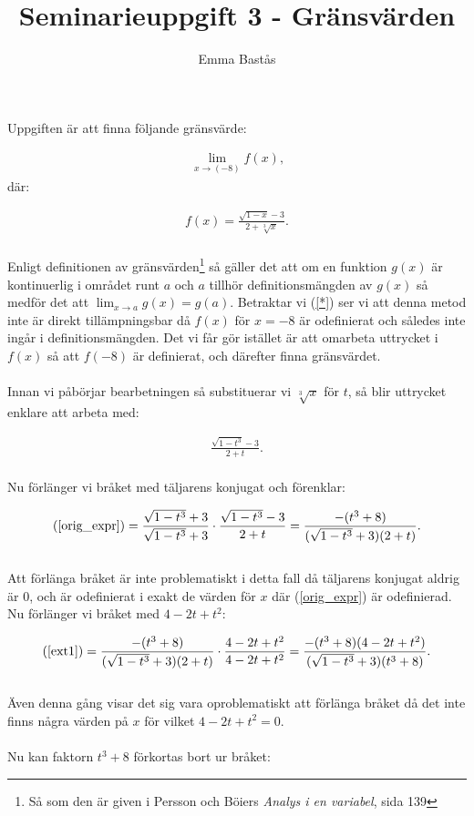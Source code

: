 \documentclass{article}
\title{Seminarieuppgift 3 - Gränsvärden}
\author{Emma Bastås}
\begin{document}
\maketitle

\noindent Uppgiften är att finna följande gränsvärde:

\begin{gather*}
  \lim_{x \to (-8)}f(x)\text{,} \label{*}\tag{$\star$}
\end{gather*}
där:

\begin{gather*}
  f(x) = \frac {\sqrt{1 - x} - 3} {2 + \sqrt[3]{x}} \text{.}
\end{gather*}
\\
Enligt definitionen av gränsvärden\footnote{Så som den är given i Persson och Böiers \emph{Analys i en variabel}, sida 139} så gäller det att om en funktion $g(x)$ är kontinuerlig i området runt $a$ och $a$ tillhör definitionsmängden av $g(x)$ så medför det att $\lim_{x \to a}g(x) = g(a)$. Betraktar vi (\ref{*}) ser vi att denna metod inte är direkt tillämpningsbar då $f(x)$ för $x = -8$ är odefinierat och således inte ingår i definitionsmängden. Det vi får gör istället är att omarbeta uttrycket i $f(x)$ så att $f(-8)$ är definierat, och därefter finna gränsvärdet.
\\
\\
Innan vi påbörjar bearbetningen så substituerar vi $\sqrt[3]{x}$ för $t$, så blir uttrycket enklare att arbeta med:

\begin{gather}
  \frac{\sqrt{1 - t^{3}} - 3}{2 + t}\text{.} \label{orig_expr}
\end{gather}
\\
Nu förlänger vi bråket med täljarens konjugat och förenklar:

\begin{gather}
  \text{(\ref{orig_expr})} = \frac{\sqrt{1 - t^{3}} + 3}{\sqrt{1 - t^{3}} + 3} \cdot \frac{\sqrt{1 - t^{3}} - 3}{2 + t}
  = \frac{- (t^{3} + 8)}{(\sqrt{1 - t^{3}} + 3)(2 + t)}\text{.} \label{ext1}
\end{gather}
\\
Att förlänga bråket är inte problematiskt i detta fall då täljarens konjugat aldrig är $0$, och är odefinierat i exakt de värden för $x$ där (\ref{orig_expr}) är odefinierad.
\\
Nu förlänger vi bråket med $4 - 2t + t^{2}$:

\begin{gather}
  \text{(\ref{ext1})} = \frac{-( t^{3} + 8)}{(\sqrt{1 - t^{3}} + 3)(2 + t)} \cdot \frac{4 -2t + t^{2}}{4 -2t + t^{2}} =
  \frac{-( t^{3} + 8)(4 -2t + t^{2})}{(\sqrt{1 - t^{3}} + 3)(t^{3} + 8)}\text{.} \label{ext2}
\end{gather}
\\
Även denna gång visar det sig vara oproblematiskt att förlänga bråket då det inte finns några värden på $x$ för vilket $4 - 2t + t^{2} = 0$.
\\
\\
Nu kan faktorn $t^{3} + 8$ förkortas bort ur bråket:
\end{document}
